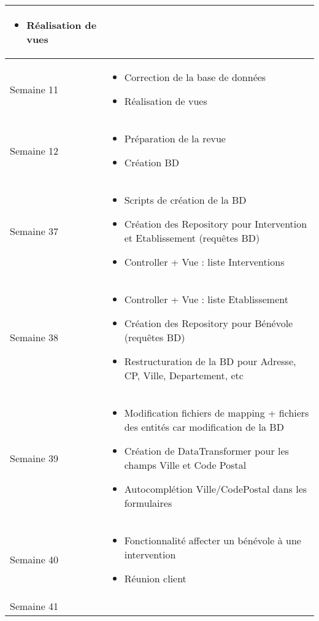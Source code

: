 \documentclass [a4paper] {article}
\begin{document}
\begin{longtable}{|>{\columncolor{gray!40}}p{2cm}|p{12cm}|}
\begin{itemize}
	\item Réalisation de vues
	\end{itemize} \\
	\hline
	Semaine 11 & \begin{itemize}
	\item Correction de la base de données
	\item Réalisation de vues 
	\end{itemize} \\
	\hline
	Semaine 12 & \begin{itemize}
	\item Préparation de la revue
	\item Création BD
	\end{itemize} \\
	\hline
	Semaine 37 & \begin{itemize}
	\item Scripts de création de la BD
	\item Création des Repository pour Intervention et Etablissement (requêtes BD)
	\item Controller + Vue : liste Interventions
	\end{itemize} \\
	\hline
	Semaine 38 & \begin{itemize}
	\item Controller + Vue : liste Etablissement
	\item Création des Repository pour Bénévole (requêtes BD)
	\item Restructuration de la BD pour Adresse, CP, Ville, Departement, etc
	\end{itemize} \\
	\hline
	Semaine 39 & \begin{itemize}
	\item Modification fichiers de mapping + fichiers des entités car modification de la BD
	\item Création de DataTransformer pour les champs Ville et Code Postal
	\item Autocomplétion Ville/CodePostal dans les formulaires 
	\end{itemize} \\
	\hline
	Semaine 40 & \begin{itemize}
	\item Fonctionnalité affecter un bénévole à une intervention
	\item Réunion client
	\end{itemize} \\
	\hline
	Semaine 41 & \begin{itemize}

\end{itemize}
\end{longtable}
\end{document}
